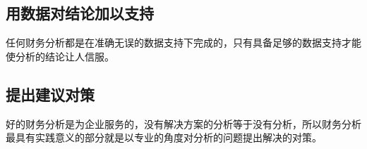 \documentclass[linespread=1.5,a4paper]{ctexart}
\begin{document}
\subsection{用数据对结论加以支持}

任何财务分析都是在准确无误的数据支持下完成的，只有具备足够的数据支持才能使分析的结论让人信服。

\subsection{提出建议对策}
好的财务分析是为企业服务的，没有解决方案的分析等于没有分析，所以财务分析最具有实践意义的部分就是以专业的角度对分析的问题提出解决的对策。
\end{document}
